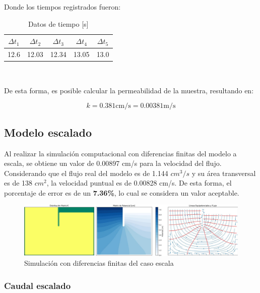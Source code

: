 Donde los tiempos registrados fueron:

\begin{table}[H]
    \centering
    \caption{Datos de tiempo [s]}
    \begin{tabular}{|c|c|c|c|c|}
    \hline
    $\Delta t_1$ & $\Delta t_2$ & $\Delta t_3$ & $\Delta t_4$ & $\Delta t_5$ \\ \hline
    12.6 & 12.03 & 12.34 & 13.05 & 13.0 \\ \hline
    \end{tabular}\\
    \label{tab:tiempos}
\end{table}

De esta forma, es posible calcular la permeabilidad de la muestra, resultando en:

\begin{equation}
    k = 0.381 \text{cm/s} = 0.00381 \text{m/s}
\end{equation}

\subsection{Modelo escalado}

Al realizar la simulación computacional con diferencias finitas del modelo a escala, se obtiene un valor de 0.00897 cm/s para la velocidad del flujo. Considerando que el flujo real del modelo es de 1.144 $cm^3/s$ y su área transversal es de 138 $cm^2$, la velocidad puntual es de 0.00828 cm/s. De esta forma, el porcentaje de error es de un \textbf{7.36\%}, lo cual se considera un valor aceptable.


\begin{figure}[H]
    \centering
    \includegraphics[width=1\textwidth]{GRAFICOS/laplace_escala_cm.jpg}
    \caption{Simulación con diferencias finitas del caso escala}
    \label{fig:maqueta_caso_1}
\end{figure}

\subsubsection{Caudal escalado}

